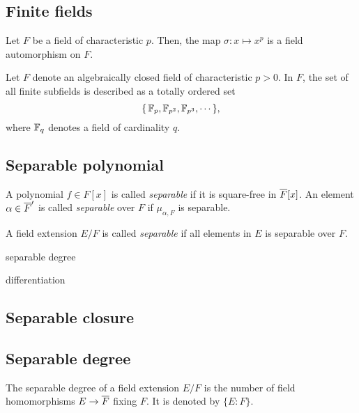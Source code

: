 \documentclass{../exp}
\begin{document}
\subsection{Finite fields}

\begin{lem}
Let $F$ be a field of characteristic $p$.
Then, the map $\sigma:x\mapsto x^p$ is a field automorphism on $F$.
\end{lem}


\begin{lem}
Let $F$ denote an algebraically closed field of characteristic $p>0$.
In $F$, the set of all finite subfields is described as a totally ordered set
\[\{\,\mathbb{F}_p,\mathbb{F}_{p^2},\mathbb{F}_{p^3},\cdots\,\},\]
where $\mathbb{F}_q$ denotes a field of cardinality $q$.
\end{lem}








\subsection{Separable polynomial}
\begin{defn}
A polynomial $f\in F[x]$ is called \emph{separable} if it is square-free in $\overline F[x]$.
An element $\alpha\in\overline F'$ is called \emph{separable} over $F$ if $\mu_{\alpha,F}$ is separable.
\end{defn}

\begin{defn}
A field extension $E/F$ is called \emph{separable} if all elements in $E$ is separable over $F$.
\end{defn}

separable degree

differentiation



\subsection{Separable closure}



\subsection{Separable degree}

\begin{thm}
The separable degree of a field extension $E/F$ is the number of field homomorphisms $E\to\cl F$ fixing $F$.
It is denoted by $\{E:F\}$.
\end{thm}
\end{document}
